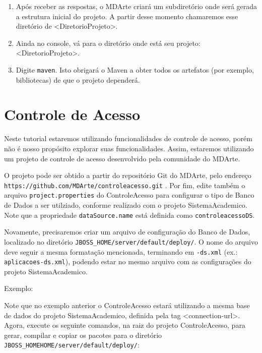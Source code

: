 \begin{enumerate}
\item Após receber as respostas, o MDArte criará um subdiretório onde será
gerada a estrutura inicial do projeto. A partir desse momento chamaremos esse
diretório de <DiretorioProjeto>.

\item Ainda no console, vá para o diretório onde está seu projeto:
<DiretorioProjeto>.

\item Digite \texttt{maven}. Isto obrigará o Maven a obter todos os artefatos (por
exemplo, bibliotecas) de que o projeto dependerá.

\end{enumerate}

\section{Controle de Acesso}

Neste tutorial estaremos utilizando funcionalidades de controle de acesso, porém
não é nosso propósito explorar suas funcionalidades. Assim, estaremos utilizando
um projeto de controle de acesso desenvolvido pela comunidade do MDArte.

O projeto pode ser obtido a partir do repositório Git do MDArte, pelo endereço
\texttt{https://github.com/MDArte/controleacesso.git} . Por fim, edite também o
arquivo \texttt{project.properties} do ControleAcesso para configurar o tipo de
Banco de Dados a ser utilziado, conforme realizado com o projeto
SistemaAcademico. Note que a propriedade \texttt{dataSource.name} está definida como
\texttt{controleacessoDS}.

Novamente, precisaremos criar um arquivo de configuração do Banco de Dados,
localizado no diretório
\texttt{\textdollar{}JBOSS\_HOME/server/default/deploy/}. O nome do arquivo deve
seguir a mesma formatação mencionada, terminando em \texttt{-ds.xml} (ex.:
\texttt{aplicacoes-ds.xml}), podendo estar no mesmo arquivo com as configurações
do projeto SistemaAcademico.

Exemplo:

\begin{framed}
	
\end{framed}

Note que no exemplo anterior o ControleAcesso estará utilizando a mesma base de
dados do projeto SistemaAcademico, definida pela tag <connection-url>. Agora,
execute os seguinte comandos, na raiz do projeto ControleAcesso, para gerar,
compilar e copiar os pacotes para o diretório \texttt{\textdollar{}JBOSS\_HOMEHOME/server/default/deploy/}:

